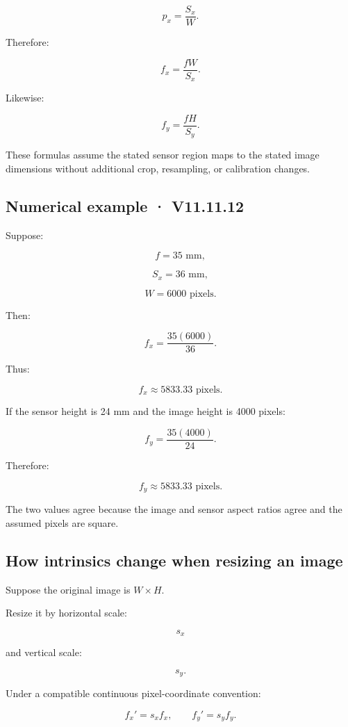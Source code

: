 \[
 p_x=\frac{S_x}{W}.
\]

Therefore:

\[
 \boxed{ f_x=\frac{fW}{S_x} }.
\]

Likewise:

\[
 \boxed{ f_y=\frac{fH}{S_y} }.
\]

These formulas assume the stated sensor region maps to the stated image dimensions without additional crop, resampling, or calibration changes.

\subsection{Numerical example · V11.11.12}\label{02-foundations-ii-ch034-numerical-example-v11.11.12}

Suppose:

\[
 f=35\text{ mm},
\]

\[
 S_x=36\text{ mm},
\]

\[
 W=6000\text{ pixels}.
\]

Then:

\[
 f_x=\frac{35(6000)}{36}.
\]

Thus:

\[
 \boxed{ f_x\approx5833.33\text{ pixels} }.
\]

If the sensor height is 24 mm and the image height is 4000 pixels:

\[
 f_y=\frac{35(4000)}{24}.
\]

Therefore:

\[
 \boxed{ f_y\approx5833.33\text{ pixels} }.
\]

The two values agree because the image and sensor aspect ratios agree and the assumed pixels are square.

\subsection{How intrinsics change when resizing an image}\label{02-foundations-ii-ch034-how-intrinsics-change-when-resizing-an-image}

Suppose the original image is \(W\times H\).

Resize it by horizontal scale:

\[
 s_x
\]

and vertical scale:

\[
 s_y.
\]

Under a compatible continuous pixel-coordinate convention:

\[
 \boxed{ f_x'=s_xf_x, \qquad f_y'=s_yf_y }.
\]

